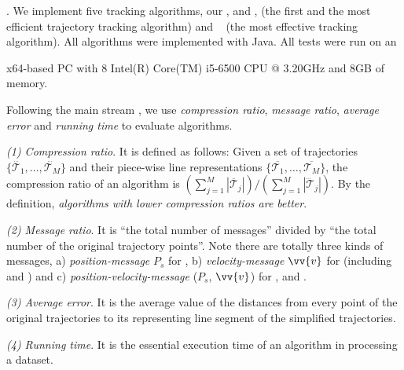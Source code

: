 .
We implement five tracking algorithms, \ie our \citt, \sitt and \bitt, \ldrh \cite{Trajcevski:LDRH} (the first and the most efficient trajectory tracking algorithm) and \grts~\cite{Lange:GRTS,Lange:Tracking} (the most effective tracking algorithm).
All algorithms were implemented with Java.
All tests were run on an {x64-based  PC with 8 Intel(R) Core(TM) i5-6500 CPU @ 3.20GHz and 8GB of memory.
	
Following the main stream \cite{Trajcevski:LDRH, Lange:GRTS, Lange:Tracking, Lin:Cised, Zhang:Evaluation}, we use \emph{compression ratio}, \emph{message ratio}, \emph{average error} and \emph{running time} to evaluate algorithms.

 \ni \emph{(1) Compression ratio}. {It is defined as follows: Given a set of trajectories $\{\dddot{\mathcal{T}_1}, \ldots, \dddot{\mathcal{T}_M}\}$ and their piece-wise line representations $\{\overline{\mathcal{T}_1}, \ldots, \overline{\mathcal{T}_M}\}$, the compression ratio of an algorithm is $(\sum_{j=1}^{M} |\overline{\mathcal{T}}_j |)/(\sum_{j=1}^{M} |\dddot{\mathcal{T}}_j |)$.
	By the definition, \emph{algorithms with lower compression ratios are better}.}

 \ni \emph{(2) Message ratio}. It is ``the total number of messages'' divided by ``the total number of the original trajectory points''. Note there are totally three kinds of messages, \ie a) \emph{position-message} $P_s$ for \grts, b) \emph{velocity-message} $\vv{v}$ for \bitt (including \citt and \sitt) and c) \emph{position-velocity-message} ($P_s$, $\vv{v}$) for \ldrh, \grts and \bitt. 
 

 \ni \emph{(3) Average error}. It is the average value of the distances from every point of the original trajectories to its representing line segment of the simplified trajectories.
 
 \ni \emph{(4) Running time}. It is the essential execution time of an algorithm in processing a dataset.
 



}
